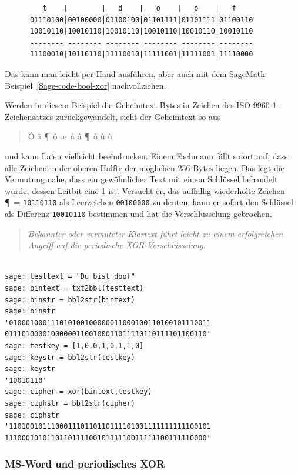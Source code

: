 \begin{refsegment}
\begin{verbatim}
         t    |        |   d    |   o    |   o    |   f
      01110100|00100000|01100100|01101111|01101111|01100110
      10010110|10010110|10010110|10010110|10010110|10010110
      -------- -------- -------- -------- -------- --------
      11100010|10110110|11110010|11111001|11111001|11110000
\end{verbatim}
Das kann man leicht per Hand ausführen, aber auch mit dem
SageMath-Beispiel~\ref{Sage-code-bool-xor} nachvollziehen.

Werden in diesem Beispiel die Geheimtext-Bytes in Zeichen des
ISO-9960-1-Zeichensatzes zurückgewandelt, sieht der Geheimtext
so aus
\begin{quote}
   \`O \~a \P\ \^o \oe\ \r{a} \^a \P\ \`o \`u \`u \dh
\end{quote}
und kann Laien vielleicht beeindrucken. Einem Fachmann fällt sofort auf, dass alle Zeichen
in der oberen Hälfte der möglichen 256 Bytes liegen. Das legt die Vermutung
nahe, dass ein gewöhnlicher Text mit einem Schlüssel behandelt wurde, dessen Leitbit
eine 1 ist. Versucht er, das auffällig wiederholte Zeichen \P\ = {\tt 10110110} als
Leerzeichen {\tt 00100000} zu deuten, kann er sofort den Schlüssel als Differenz
{\tt 10010110} bestimmen und hat die Verschlüsselung gebrochen.
\begin{quote}
   {\em Bekannter oder
   vermuteter Klartext führt leicht zu einem
   erfolgreichen Angriff auf die periodische XOR-Verschlüsselung.}
\end{quote}

\begin{sagecode}
\begin{verbatim}

sage: testtext = "Du bist doof"
sage: bintext = txt2bbl(testtext)
sage: binstr = bbl2str(bintext)
sage: binstr
'010001000111010100100000011000100110100101110011
011101000010000001100100011011110110111101100110'
sage: testkey = [1,0,0,1,0,1,1,0]
sage: keystr = bbl2str(testkey)
sage: keystr
'10010110'
sage: cipher = xor(bintext,testkey)
sage: ciphstr = bbl2str(cipher)
sage: ciphstr
'110100101110001110110110111101001111111111100101
111000101011011011110010111110011111100111110000'
\end{verbatim}
\caption{XOR-Verschlüsselung in Python/SageMath}\label{Sage-code-bool-xor}
\end{sagecode}


\subsubsection*{MS-Word und periodisches XOR}


\end{refsegment}
